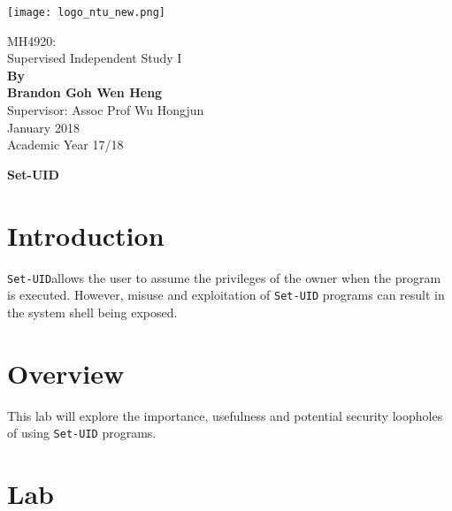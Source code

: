 \documentclass[a4paper,12pt]{article}
\newcommand{\setuid}{\texttt{Set-UID}}
\begin{document}
	\begin{titlepage}
		\begin{center}
			\texttt{[image: logo\_ntu\_new.png]}
			\vspace*{7em}
			
			
			\Huge MH4920:\\Supervised Independent Study I\\		
			\LARGE
			\vspace{2cm}
			\textbf{By\\ Brandon Goh Wen Heng}\\\vspace{2cm}
			Supervisor: Assoc Prof Wu Hongjun
			\\\vspace{2cm}January 2018\\
			Academic Year 17/18\\\vspace{1.2cm}
			
			\vfill
		\end{center}
\end{titlepage}





	
\begin{titlepage}
	\begin{center}
		\vspace*{27em}
		\Huge
		\textbf{Set-UID\\}		
		\vfill
	\end{center}
\end{titlepage}
\newpage
{}
\setcounter{section}{0}
\section{Introduction}
\setuid allows the user to assume the privileges of the owner when the program is executed. However, misuse and exploitation of \texttt{Set-UID} programs can result in the system shell being exposed.
\section{Overview}
This lab will explore the importance, usefulness and potential security loopholes of using \texttt{Set-UID} programs.
\newpage
\section{Lab}
\end{document}

